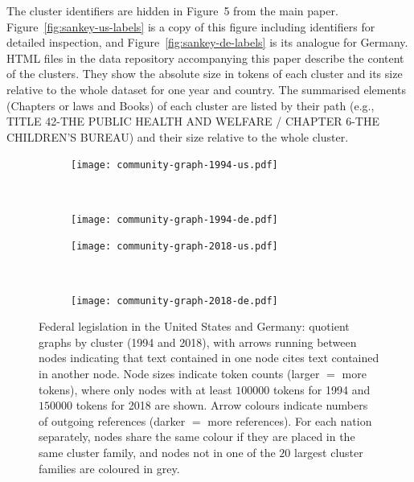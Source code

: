 The cluster identifiers are hidden in Figure~5 from the main paper. Figure~\ref{fig:sankey-us-labels} is a copy of this figure including identifiers for detailed inspection, 
and Figure~\ref{fig:sankey-de-labels} is its analogue for Germany.
HTML files in the data repository accompanying this paper describe the content of the clusters. 
They show the absolute size in tokens of each cluster and its size relative to the whole dataset for one year and country. 
The summarised elements (Chapters or laws and Books) of each cluster are listed by their path (e.g., TITLE 42-THE PUBLIC HEALTH AND WELFARE / CHAPTER 6-THE CHILDREN'S BUREAU) and their size relative to the whole cluster.

\begin{figure}[H]
	\centering
	\begin{subfigure}{0.5\linewidth}
		\texttt{[image: community-graph-1994-us.pdf]}~%
	\end{subfigure}~%
	\begin{subfigure}{0.5\linewidth}
		\texttt{[image: community-graph-1994-de.pdf]}~%
	\end{subfigure}
	\begin{subfigure}{0.5\linewidth}
		\texttt{[image: community-graph-2018-us.pdf]}~%
	\end{subfigure}~%
	\begin{subfigure}{0.5\linewidth}
		\texttt{[image: community-graph-2018-de.pdf]}~%
	\end{subfigure}
	\captionsetup{justification=raggedright} 
	\caption{Federal legislation in the United States and Germany: quotient graphs by cluster (1994 and 2018),
		with arrows running between nodes indicating that text contained in one node cites text contained in another node.
		Node sizes indicate token counts (larger $=$ more tokens), where only nodes with at least $100000$ tokens for 1994 and $150000$ tokens for 2018
		are shown. 
		Arrow colours indicate numbers of outgoing references (darker $=$ more references). 
		For each nation separately, nodes share the same colour if they are placed in the same cluster family,
		and nodes not in one of the $20$ largest cluster families are coloured in grey.
	}
	\label{fig:us-de-cluster-quotient}
\end{figure}


